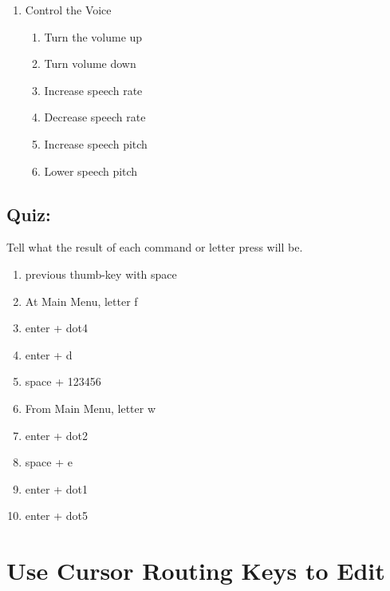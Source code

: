 \documentclass[10pt,letterpaper,twoside]{report}
\begin{document}
\begin{enumerate}
	\item Control the Voice
	      \begin{enumerate}
		      \item Turn the volume up 
		      \item Turn volume down 
		      \item Increase speech rate 
		      \item Decrease speech rate 
		      \item Increase speech pitch 
		      \item Lower speech pitch 
	      \end{enumerate}
\end{enumerate}
\subsection{Quiz:}
Tell what the result of each command or letter press will be.
\begin{enumerate}
	\item previous thumb-key with space
	\item At Main Menu, letter f
	\item enter + dot4
	\item enter + d
	\item space + 123456
	\item From Main Menu, letter w
	\item enter + dot2
	\item space + e
	\item enter + dot1
	\item enter + dot5
\end{enumerate}



\clearpage
\section{Use Cursor Routing Keys to Edit}
\end{document}
